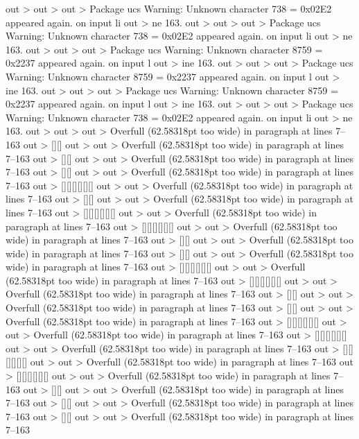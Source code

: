 out >
out >
out > Package ucs Warning: Unknown character 738 = 0x02E2 appeared again. on input li
out > ne 163.
out >
out >
out > Package ucs Warning: Unknown character 738 = 0x02E2 appeared again. on input li
out > ne 163.
out >
out >
out > Package ucs Warning: Unknown character 8759 = 0x2237 appeared again. on input l
out > ine 163.
out >
out >
out > Package ucs Warning: Unknown character 8759 = 0x2237 appeared again. on input l
out > ine 163.
out >
out >
out > Package ucs Warning: Unknown character 8759 = 0x2237 appeared again. on input l
out > ine 163.
out >
out >
out > Package ucs Warning: Unknown character 738 = 0x02E2 appeared again. on input li
out > ne 163.
out >
out >
out > Overfull \hbox (62.58318pt too wide) in paragraph at lines 7--163
out >  [][] 
out >
out > Overfull \hbox (62.58318pt too wide) in paragraph at lines 7--163
out >  [][] 
out >
out > Overfull \hbox (62.58318pt too wide) in paragraph at lines 7--163
out >  [][] 
out >
out > Overfull \hbox (62.58318pt too wide) in paragraph at lines 7--163
out >  [][][][][][] 
out >
out > Overfull \hbox (62.58318pt too wide) in paragraph at lines 7--163
out >  [][] 
out >
out > Overfull \hbox (62.58318pt too wide) in paragraph at lines 7--163
out >  [][][][][][] 
out >
out > Overfull \hbox (62.58318pt too wide) in paragraph at lines 7--163
out >  [][][][][][] 
out >
out > Overfull \hbox (62.58318pt too wide) in paragraph at lines 7--163
out >  [][] 
out >
out > Overfull \hbox (62.58318pt too wide) in paragraph at lines 7--163
out >  [][] 
out >
out > Overfull \hbox (62.58318pt too wide) in paragraph at lines 7--163
out >  [][][][][][] 
out >
out > Overfull \hbox (62.58318pt too wide) in paragraph at lines 7--163
out >  [][][][][][] 
out >
out > Overfull \hbox (62.58318pt too wide) in paragraph at lines 7--163
out >  [][] 
out >
out > Overfull \hbox (62.58318pt too wide) in paragraph at lines 7--163
out >  [][] 
out >
out > Overfull \hbox (62.58318pt too wide) in paragraph at lines 7--163
out >  [][][][][][] 
out >
out > Overfull \hbox (62.58318pt too wide) in paragraph at lines 7--163
out >  [][][][][][] 
out >
out > Overfull \hbox (62.58318pt too wide) in paragraph at lines 7--163
out >  [][][][][][] 
out >
out > Overfull \hbox (62.58318pt too wide) in paragraph at lines 7--163
out >  [][][][][][] 
out >
out > Overfull \hbox (62.58318pt too wide) in paragraph at lines 7--163
out >  [][] 
out >
out > Overfull \hbox (62.58318pt too wide) in paragraph at lines 7--163
out >  [][] 
out >
out > Overfull \hbox (62.58318pt too wide) in paragraph at lines 7--163
out >  [][] 
out >
out > Overfull \hbox (62.58318pt too wide) in paragraph at lines 7--163

